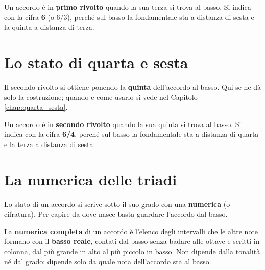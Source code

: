 \begin{definizione}
	\label{def:primo_rivolto}
	Un accordo è in \textbf{primo rivolto} quando la sua terza si trova al basso. Si indica con la cifra \textbf{6} (o 6/3), perché sul basso la fondamentale sta a distanza di sesta e la quinta a distanza di terza.
\end{definizione}

\begin{esempio}
	\label{ex:primo_rivolto_triadi}
\end{esempio}

\section{Lo stato di quarta e sesta}
\label{subsec:secondo_rivolto}

Il secondo rivolto si ottiene ponendo la \textbf{quinta} dell'accordo al basso. Qui se ne dà solo la costruzione; quando e come usarlo si vede nel Capitolo \ref{chap:quarta_sesta}.

\begin{definizione}
	\label{def:secondo_rivolto}
	Un accordo è in \textbf{secondo rivolto} quando la sua quinta si trova al basso. Si indica con la cifra \textbf{6/4}, perché sul basso la fondamentale sta a distanza di quarta e la terza a distanza di sesta.
\end{definizione}

\begin{esempio}
	\label{ex:secondo_rivolto_triadi}
\end{esempio}

\section{La numerica delle triadi}
\label{subsec:cifratura_accordi}

Lo stato di un accordo si scrive sotto il suo grado con una \textbf{numerica} (o cifratura). Per capire da dove nasce basta guardare l'accordo dal basso.

\begin{definizione}
	\label{def:numerica_accordo}
	La \textbf{numerica completa} di un accordo è l'elenco degli intervalli che le altre note formano con il \textbf{basso reale}, contati dal basso senza badare alle ottave e scritti in colonna, dal più grande in alto al più piccolo in basso. Non dipende dalla tonalità né dal grado: dipende solo da quale nota dell'accordo sta al basso.
\end{definizione}

